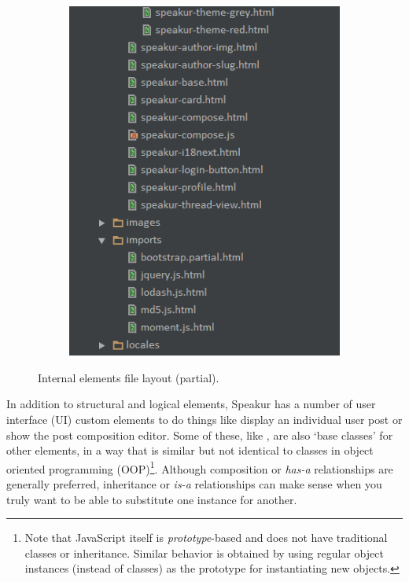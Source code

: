 \begin{figure}[htb]
{\begin{subfigure}[b]{0.48\textwidth}
		\includegraphics[width=\textwidth]{images/file_layout_b.png}
	\end{subfigure} %
	}
	\caption{Internal elements file layout (partial).}
	\label{f:file_layout}
\end{figure}

In addition to structural and logical elements, Speakur has a number of user interface (UI) custom elements to do things like display an individual user post or show the post composition editor.
Some of these, like , are also `base classes' for other elements,
in a way that is similar but not identical to classes in object oriented programming (OOP)\footnote{Note that JavaScript itself is \textit{prototype}-based and does not have traditional classes or inheritance. 
Similar behavior is obtained by using regular object instances (instead of classes) as the prototype for instantiating new objects.}. 
Although composition or \textit{has-a} relationships are generally preferred, inheritance or \textit{is-a} relationships can make sense when you truly want to be able to substitute one instance for another.

